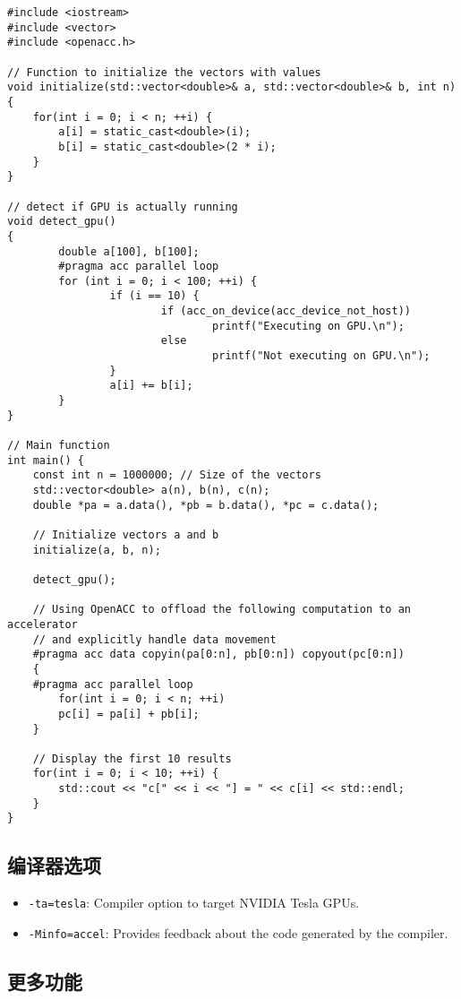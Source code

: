\begin{lstlisting}[language=none,caption=test1.cpp]
#include <iostream>
#include <vector>
#include <openacc.h>

// Function to initialize the vectors with values
void initialize(std::vector<double>& a, std::vector<double>& b, int n) {
    for(int i = 0; i < n; ++i) {
        a[i] = static_cast<double>(i);
        b[i] = static_cast<double>(2 * i);
    }
}

// detect if GPU is actually running
void detect_gpu()
{
        double a[100], b[100];
        #pragma acc parallel loop
        for (int i = 0; i < 100; ++i) {
                if (i == 10) {
                        if (acc_on_device(acc_device_not_host))
                                printf("Executing on GPU.\n");
                        else
                                printf("Not executing on GPU.\n");
                }
                a[i] += b[i];
        }
}

// Main function
int main() {
    const int n = 1000000; // Size of the vectors
    std::vector<double> a(n), b(n), c(n);
    double *pa = a.data(), *pb = b.data(), *pc = c.data();

    // Initialize vectors a and b
    initialize(a, b, n);

    detect_gpu();

    // Using OpenACC to offload the following computation to an accelerator
    // and explicitly handle data movement
    #pragma acc data copyin(pa[0:n], pb[0:n]) copyout(pc[0:n])
    {
	#pragma acc parallel loop
        for(int i = 0; i < n; ++i)
		pc[i] = pa[i] + pb[i];
    }

    // Display the first 10 results
    for(int i = 0; i < 10; ++i) {
        std::cout << "c[" << i << "] = " << c[i] << std::endl;
    }
}
\end{lstlisting}

\subsection{编译器选项}
\begin{itemize}
\item \verb`-ta=tesla`: Compiler option to target NVIDIA Tesla GPUs.
\item \verb`-Minfo=accel`: Provides feedback about the code generated by the compiler.
\end{itemize}

\subsection{更多功能}
